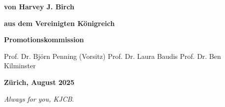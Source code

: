 \documentclass[a4paper,11pt,usegeometry]{scrreprt} %
\begin{document}
\begin{titlepage}
\begin{center}
\bfseries %
von%
\break
\break
\mdseries %
Harvey J. Birch%
\break

\bfseries %
aus%
\break
\break
\mdseries %
dem Vereinigten K\"onigreich%
\break
\break
\break
\break

\bfseries %
Promotionskommission%
\vspace{3pt}%
\break
\break
\hspace*{11.5mm}%
\begin{minipage}{7cm}
\flushleft %
\mdseries %
Prof. Dr. Bj\"orn Penning (Vorsitz) %
\break
\break
Prof. Dr.  Laura Baudis%
\break
\break
Prof. Dr. Ben Kilminster%
\end{minipage}
\break
\break
\break
\break
\break
\break

\bfseries%
Z\"urich, August 2025%

\end{center}
\end{titlepage}
\restoregeometry
{}
\newpage\null\thispagestyle{empty}\newpage
\clearpage
\vspace*{\fill}
\begin{center}
\begin{minipage}{.6\textwidth}
\textit{Always for you, KJCB}.
\end{minipage}
\end{center}
\vfill %
\clearpage
\newpage\null\thispagestyle{empty}\newpage
\justifying
\end{document}
